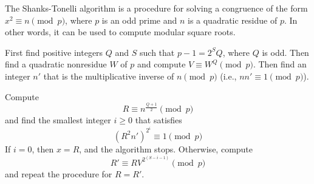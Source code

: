 \documentclass[12pt]{article}
\begin{document}
The Shanks-Tonelli algorithm is a procedure for solving a congruence of the form $x^2 \equiv n \pmod{p}$, where $p$ is an odd prime and $n$ is a quadratic residue of $p$.  In other words, it can be used to compute modular square roots.

First find positive integers $Q$ and $S$ such that $p - 1 = 2^SQ$, where $Q$ is odd.  Then find a quadratic nonresidue $W$ of $p$ and compute $V \equiv W^Q \pmod{p}$.  Then find an integer $n'$ that is the multiplicative inverse of $n \pmod{p}$ (i.e., $nn' \equiv 1 \pmod{p}$).

Compute
$$R \equiv n^{\frac{Q+1}{2}} \pmod{p}$$
and find the smallest integer $i \geq 0$ that satisfies
$$(R^2n')^{2^i} \equiv 1 \pmod{p}$$
If $i=0$, then $x = R$, and the algorithm stops.  Otherwise, compute
$$R' \equiv RV^{2^{(S-i-1)}} \pmod{p}$$
and repeat the procedure for $R = R'$.
\end{document}
